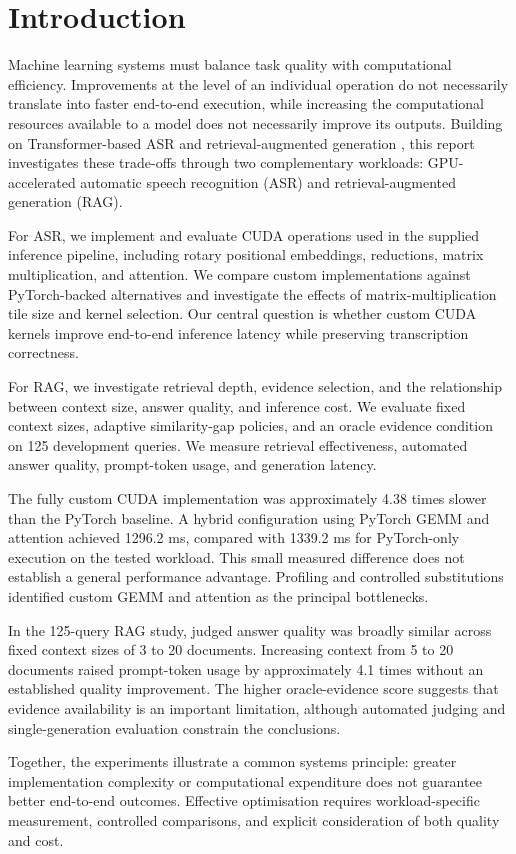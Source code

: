 \section{Introduction}
\label{sec:introduction}

Machine learning systems must balance task quality with computational
efficiency. Improvements at the level of an individual operation do not
necessarily translate into faster end-to-end execution, while increasing
the computational resources available to a model does not necessarily
improve its outputs. Building on Transformer-based ASR \citep{vaswani2017attention,radford2023robust} and retrieval-augmented generation \citep{lewis2020retrieval}, this report investigates these trade-offs through
two complementary workloads: GPU-accelerated automatic speech
recognition (ASR) and retrieval-augmented generation (RAG).

For ASR, we implement and evaluate CUDA operations used in the supplied
inference pipeline, including rotary positional embeddings, reductions,
matrix multiplication, and attention. We compare custom implementations
against PyTorch-backed alternatives and investigate the effects of
matrix-multiplication tile size and kernel selection. Our central
question is whether custom CUDA kernels improve end-to-end inference
latency while preserving transcription correctness.

For RAG, we investigate retrieval depth, evidence selection,
and the relationship between context size, answer quality, and
inference cost. We evaluate fixed context sizes, adaptive
similarity-gap policies, and an oracle evidence condition on
125 development queries. We measure retrieval effectiveness,
automated answer quality, prompt-token usage, and generation
latency.

The fully custom CUDA implementation was approximately 4.38 times
slower than the PyTorch baseline. A hybrid configuration using
PyTorch GEMM and attention achieved 1296.2 ms, compared with
1339.2 ms for PyTorch-only execution on the tested workload.
This small measured difference does not establish a general
performance advantage. Profiling and controlled substitutions
identified custom GEMM and attention as the principal bottlenecks.

In the 125-query RAG study, judged answer quality was broadly
similar across fixed context sizes of 3 to 20 documents.
Increasing context from 5 to 20 documents raised prompt-token
usage by approximately 4.1 times without an established quality
improvement. The higher oracle-evidence score suggests that
evidence availability is an important limitation, although
automated judging and single-generation evaluation constrain
the conclusions.

Together, the experiments illustrate a common systems principle:
greater implementation complexity or computational expenditure does
not guarantee better end-to-end outcomes. Effective optimisation
requires workload-specific measurement, controlled comparisons, and
explicit consideration of both quality and cost.
